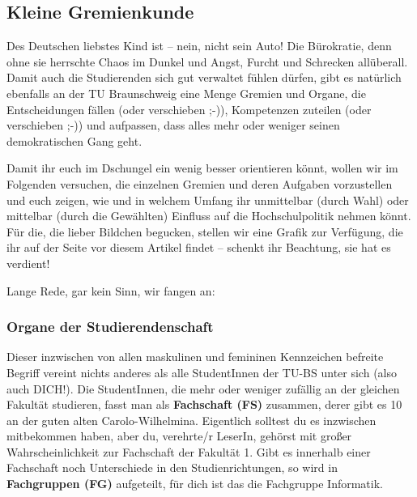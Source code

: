\begin{multicols}{2}
\subsection{Kleine Gremienkunde}
	Des Deutschen liebstes Kind ist -- nein, nicht sein Auto! Die Bürokratie, denn ohne sie herrschte Chaos im Dunkel und Angst, Furcht und Schrecken allüberall. Damit auch die Studierenden sich gut verwaltet fühlen dürfen, gibt es natürlich ebenfalls an der TU Braunschweig eine Menge Gremien und Organe, die Entscheidungen fällen (oder verschieben ;-)), Kompetenzen zuteilen (oder verschieben ;-)) und aufpassen, dass alles mehr oder weniger seinen demokratischen Gang geht.

	Damit ihr euch im Dschungel ein wenig besser orientieren könnt, wollen wir im Folgenden versuchen, die einzelnen Gremien und deren Aufgaben vorzustellen und euch zeigen, wie und in welchem Umfang ihr unmittelbar (durch Wahl) oder mittelbar (durch die Gewählten) Einfluss auf die Hochschulpolitik nehmen könnt. Für die, die lieber Bildchen begucken, stellen wir eine Grafik zur Verfügung, die ihr auf der Seite vor diesem Artikel findet -- schenkt ihr Beachtung, sie hat es verdient!

	Lange Rede, gar kein Sinn, wir fangen an:

	\subsubsection*{Organe der Studierendenschaft}
		Dieser inzwischen von allen maskulinen und femininen Kennzeichen befreite Begriff vereint nichts anderes als alle StudentInnen der TU-BS unter sich (also auch DICH!). Die StudentInnen, die mehr oder weniger zufällig an der gleichen Fakultät studieren, fasst man als \textbf{Fachschaft (FS)} zusammen, derer gibt es 10 an der guten alten Carolo-Wilhelmina. Eigentlich solltest du es inzwischen mitbekommen haben, aber du, verehrte/r LeserIn, gehörst mit großer Wahrscheinlichkeit zur Fachschaft der Fakultät 1. Gibt es innerhalb einer Fachschaft noch Unterschiede in den Studienrichtungen, so wird in \textbf{Fachgruppen (FG)} aufgeteilt, für dich ist das die Fachgruppe Informatik.


\end{multicols}
